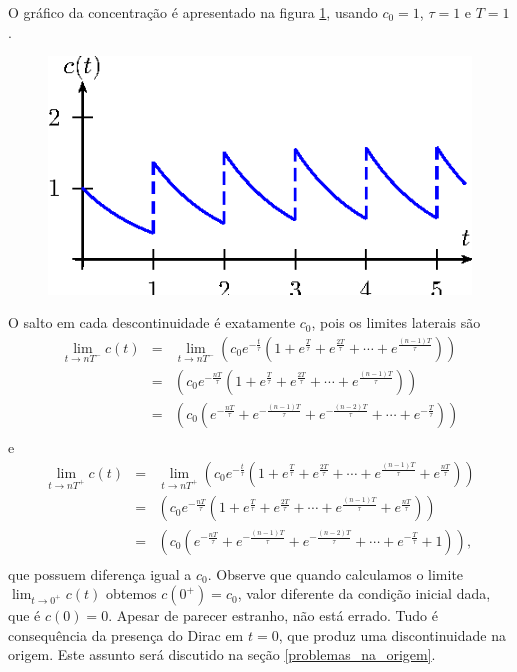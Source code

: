  O gráfico da concentração é apresentado na figura \ref{concentracao}, usando $c_0=1$, $\tau=1$ e $T=1$.
\begin{figure}[!ht]
\begin{center}

\includegraphics{cap_dirac_conv/pics/figura_12}\end{center}
\caption{\label{concentracao}}
\end{figure}
O salto em cada descontinuidade é exatamente $c_0$, pois os limites laterais são
\begin{eqnarray*}
\lim_{t\to nT^-}c(t)&=&\lim_{t\to nT^-}\left(c_0e^{-\frac{t}{\tau}}\left(1+e^{\frac{T}{\tau}}+e^{\frac{2T}{\tau}}+\cdots+ e^{\frac{(n-1)T}{\tau}}\right)\right)\\
&=&\left(c_0e^{-\frac{nT}{\tau}}\left(1+e^{\frac{T}{\tau}}+e^{\frac{2T}{\tau}}+\cdots+ e^{\frac{(n-1)T}{\tau}}\right)\right)\\
&=&\left(c_0\left(e^{-\frac{nT}{\tau}}+e^{-\frac{(n-1)T}{\tau}}+e^{-\frac{(n-2)T}{\tau}}+\cdots+ e^{-\frac{T}{\tau}}\right)\right)\\
\end{eqnarray*}
e
\begin{eqnarray*}
\lim_{t\to nT^+}c(t)&=&\lim_{t\to nT^+}\left(c_0e^{-\frac{t}{\tau}}\left(1+e^{\frac{T}{\tau}}+e^{\frac{2T}{\tau}}+\cdots+ e^{\frac{(n-1)T}{\tau}}+ e^{\frac{nT}{\tau}}\right)\right)\\
&=&\left(c_0e^{-\frac{nT}{\tau}}\left(1+e^{\frac{T}{\tau}}+e^{\frac{2T}{\tau}}+\cdots+ e^{\frac{(n-1)T}{\tau}}+ e^{\frac{nT}{\tau}}\right)\right)\\
&=&\left(c_0\left(e^{-\frac{nT}{\tau}}+e^{-\frac{(n-1)T}{\tau}}+e^{-\frac{(n-2)T}{\tau}}+\cdots+ e^{-\frac{T}{\tau}}+1\right)\right),\\
\end{eqnarray*}
que possuem diferença igual a $c_0$. 
Observe que quando calculamos o limite $\displaystyle \lim_{t\to 0^+}c(t)$ obtemos $c(0^+)=c_0$, valor diferente da condição inicial dada, que é $c(0)=0$. Apesar de parecer estranho, não está errado. Tudo é consequência da presença do Dirac em $t=0$, que produz uma discontinuidade na origem. Este assunto será discutido na seção \ref{problemas_na_origem}.




